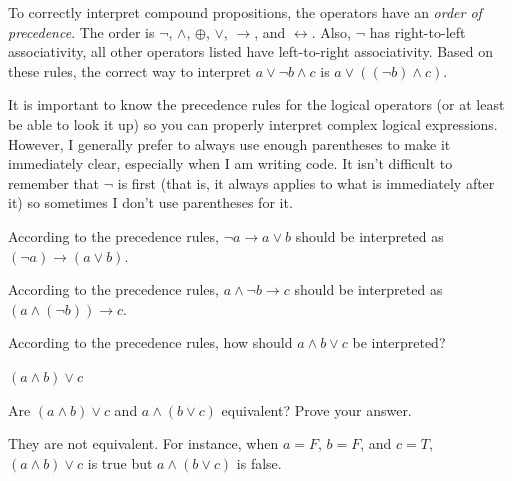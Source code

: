 To correctly interpret compound propositions, the operators have an {\em order of precedence}.
The order is $\neg$, $\wedge$, $\oplus$, $\vee$, $\rightarrow$, and $\leftrightarrow$.
Also, $\neg$ has right-to-left associativity, all other operators listed
have left-to-right associativity.
Based on these rules, 
the correct way to interpret $a \vee  \neg b \wedge c$ is $a \vee  ((\neg b) \wedge c)$.

It is important to know the precedence rules for the logical operators 
(or at least be able to look it up) so you can properly interpret complex logical expressions.
However, I generally prefer to always use enough parentheses to make it immediately clear, 
especially when I am writing code. It isn't difficult to remember that $\neg$ is first 
(that is, it always applies to what is immediately after it) so sometimes I don't use parentheses for it.

\begin{exa}
According to the precedence rules, 
$\neg a  \rightarrow a \vee b$ should be interpreted as $(\neg a)  \rightarrow
(a\vee b)$.
\end{exa} 

\vspace*{-.1in} %

\begin{exa}
According to the precedence rules, 
$a \wedge \neg b  \rightarrow c$ should be interpreted as  $(a \wedge (\neg b))
 \rightarrow c$.
\end{exa}

\vspace*{-.1in} %

\begin{exer}
According to the precedence rules, 
how should $a \wedge  b \vee c$  be interpreted?\\
\answerline
\begin{answer}
$(a \wedge  b)\vee c$
\end{answer}
\end{exer}

\vspace*{-.1in} %

\begin{ques}
Are  $(a\wedge b)\vee c$ and $a \wedge ( b\vee c)$ equivalent?  Prove your answer.\\
\answerlinetwo
\begin{answer}
They are not equivalent.  For instance, when $a=F$, $b=F$, and $c=T$, $(a\wedge b)\vee c$ is true
but $a \wedge ( b\vee c)$ is false.
\end{answer}
\end{ques}

